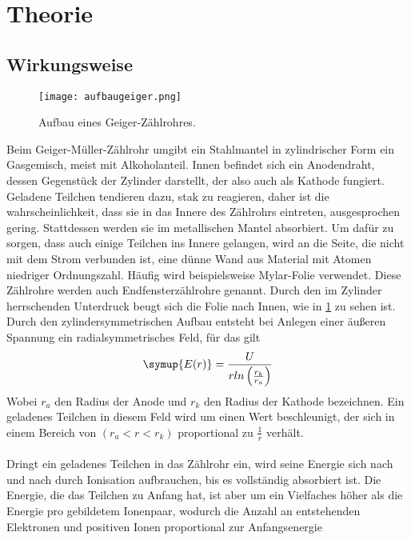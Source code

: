\section{Theorie}
\label{sec:Theorie}

\subsection{Wirkungsweise}
\begin{figure}
 \centering
 \caption{Aufbau eines Geiger-Zählrohres.}
 \texttt{[image: aufbaugeiger.png]}
 \label{fig:aufn}
\end{figure}

Beim Geiger-Müller-Zählrohr umgibt ein Stahlmantel in zylindrischer Form
ein Gasgemisch, meist mit Alkoholanteil. Innen befindet sich ein Anodendraht,
dessen Gegenstück der Zylinder darstellt, der also auch als Kathode fungiert.\\
Geladene Teilchen tendieren dazu, stak zu reagieren, daher ist die wahrscheinlichkeit,
dass sie in das Innere des Zählrohrs eintreten, ausgesprochen gering. 
Stattdessen werden sie im metallischen Mantel absorbiert. Um dafür zu 
sorgen, dass auch einige Teilchen ins Innere gelangen, wird an die Seite,
die nicht mit dem Strom verbunden ist, eine dünne Wand aus Material mit Atomen
niedriger Ordnungszahl. Häufig wird beispielsweise Mylar-Folie verwendet. 
Diese Zählrohre werden auch Endfensterzählrohre genannt. Durch den im Zylinder
herrschenden Unterdruck beugt sich die Folie nach Innen, wie in \ref{fig:aufn} 
zu sehen ist.\\
Durch den zylindersymmetrischen Aufbau entsteht bei Anlegen einer äußeren Spannung
ein radialsymmetrisches Feld, für das gilt
\begin{equation}
\symup{E(r) }= \frac{U}{r ln\left(\frac{r_k}{r_a} \right) } 
\end{equation}
Wobei $r_a$ den Radius der Anode und $r_k$ den Radius der Kathode bezeichnen.
Ein geladenes Teilchen in diesem Feld wird um einen Wert beschleunigt, der
sich in einem Bereich von $\left( r_a < r < r_k \right)$ proportional zu $\frac{1}{r}$ 
verhält. \\
\\
Dringt ein geladenes Teilchen in das Zählrohr ein, wird seine Energie 
sich nach und nach durch Ionisation aufbrauchen, bis es vollständig absorbiert
ist. Die Energie, die das Teilchen zu Anfang hat, ist aber um ein Vielfaches
höher als die Energie pro gebildetem Ionenpaar, wodurch die Anzahl an 
entstehenden Elektronen und positiven Ionen proportional zur Anfangsenergie
